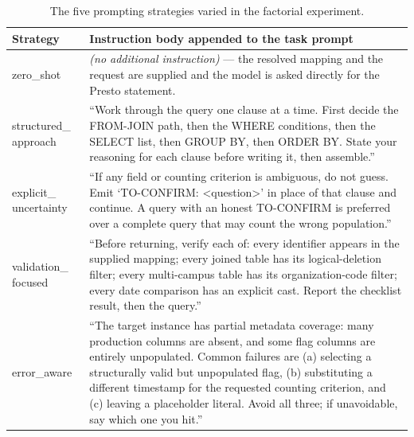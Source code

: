 \documentclass[10pt]{article}
\begin{document}
\begin{table}[h]\centering
\caption{The five prompting strategies varied in the factorial experiment.}
\footnotesize
\begin{tabular}{@{}L{3.0cm}L{11.5cm}@{}}
\toprule
Strategy & Instruction body appended to the task prompt\\
\midrule
zero\_shot &
\emph{(no additional instruction)} --- the resolved mapping and the request are
supplied and the model is asked directly for the Presto statement.\\
\addlinespace
structured\_ approach &
``Work through the query one clause at a time. First decide the FROM-JOIN path,
then the WHERE conditions, then the SELECT list, then GROUP BY, then ORDER BY.
State your reasoning for each clause before writing it, then assemble.''\\
\addlinespace
explicit\_ uncertainty &
``If any field or counting criterion is ambiguous, do not guess. Emit
`TO-CONFIRM: <question>' in place of that clause and continue. A query with an
honest TO-CONFIRM is preferred over a complete query that may count the wrong
population.''\\
\addlinespace
validation\_ focused &
``Before returning, verify each of: every identifier appears in the supplied
mapping; every joined table has its logical-deletion filter; every multi-campus
table has its organization-code filter; every date comparison has an explicit
cast. Report the checklist result, then the query.''\\
\addlinespace
error\_aware &
``The target instance has partial metadata coverage: many production columns are
absent, and some flag columns are entirely unpopulated. Common failures are (a)
selecting a structurally valid but unpopulated flag, (b) substituting a
different timestamp for the requested counting criterion, and (c) leaving a
placeholder literal. Avoid all three; if unavoidable, say which one you hit.''\\
\bottomrule
\end{tabular}
\end{table}

\end{document}
